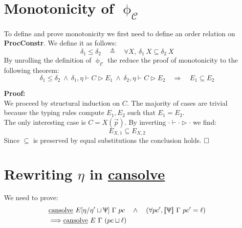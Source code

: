 \documentclass[12pt,a4paper,twoside]{book}
\newcommand{\llbracket}{[\![}
\newcommand{\rrbracket}{]\!]}
\newcommand{\qed}{\hfill\square}
\begin{document}
\begin{appendices}
\section{Monotonicity of $\upphi_\mathscr{C}$}
\label{appdix:rec:monotono}
To define and prove monotonicity we first need to define an order relation on \textbf{ProcConstr}. We define it as follows:
$$
\delta_1 \le \delta_2 \quad\triangleq\quad \forall X,~\delta_1~X\subseteq \delta_2~X
$$
By unrolling the definition of $\upphi_\mathscr{C}$ the reduce the proof of monotonicity to the following theorem:
$$
\delta_1 \le \delta_2~\land~ \delta_1,\eta\vdash C\rhd E_1 ~\land~\delta_2,\eta\vdash C\rhd E_2 \quad\Longrightarrow \quad E_1 \subseteq E_2
$$

\noindent\textbf{Proof:}\\
We proceed by structural induction on $C$. The majority of cases are trivial because the typing rules compute $E_1, E_2$ such that $E_1 = E_2$.\\
The only interesting case is $C = X(\vec{p})$. By inverting $\cdot \vdash \cdot \rhd \cdot$ we find:
$$
E_{X,1} \subseteq E_{X,2}
$$
Since $\subseteq$ is preserved by equal substitutions the conclusion holds. $\qed$

\section{Rewriting $\eta$ in \underline{cansolve}}
\label{appdix:rec:cansolve_pc}
We need to prove:
\begin{align*}
&\text{\underline{cansolve}}~E[\eta/\eta' \sqcup \Uppsi]~\Gamma~pc
\quad\land\quad (\forall pc', \llbracket \Uppsi \rrbracket~\Gamma~pc'=\ell)\\
&\Longrightarrow \text{\underline{cansolve}}~E~\Gamma~(pc\sqcup\ell)
\end{align*}


\end{appendices}
\end{document}
